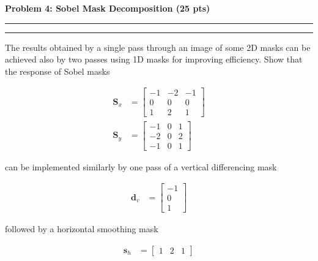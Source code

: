 \documentclass[12pt]{article}
\newcommand{\question}[1]{%
  \clearpage
  \vspace{0.5cm}
  {\noindent\normalsize \textbf{#1}}
  \vspace{0.2cm}
  \hrule
  \vspace{0.1cm}
  \hrule
  \vspace{0.3cm}
}
\begin{document}

\question{Problem 4: Sobel Mask Decomposition (25 pts)}\label{quest:4}

The results obtained by a single pass through an image of some 2D masks can be achieved also
by two passes using 1D masks for improving efficiency. Show that the response of Sobel masks

\begin{align}
\mathbf{S}_x &=
\begin{bmatrix}
-1 & -2 & -1 \\
0 & 0 & 0 \\
1 & 2 & 1
\end{bmatrix} \\[1em]
\mathbf{S}_y &=
\begin{bmatrix}
-1 & 0 & 1 \\
-2 & 0 & 2 \\
-1 & 0 & 1
\end{bmatrix}
\end{align}

can be implemented similarly by one pass of a vertical differencing mask

\begin{align}
\mathbf{d}_v &=
\begin{bmatrix}
-1 \\
0 \\
1
\end{bmatrix}
\end{align}

followed by a horizontal smoothing mask

\begin{align}
\mathbf{s}_h &=
\begin{bmatrix} 1 & 2 & 1 \end{bmatrix}
\end{align}

\end{document}
